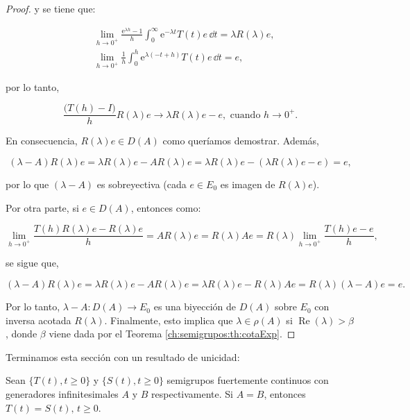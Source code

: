 \begin{proof}
    y se tiene que:

    \begin{align*}
        &\lim_{h \rightarrow 0^+} \frac{\mathrm{e}^{\lambda h} - 1}{h}\int_0^\infty \mathrm{e}^{-\lambda t}T(t)e \, \dd t = \lambda R(\lambda) e,\\
        &\lim_{h \rightarrow 0^+} \frac{1}{h}\int_0^h \mathrm{e}^{\lambda(-t + h)}T(t)e \, \dd t = e,
    \end{align*}

    por lo tanto,

    \[\frac{\big(T(h) - I\big)}{h}R(\lambda)e \rightarrow \lambda R(\lambda) e - e, \text{ cuando } h\rightarrow 0^+. \]

    En consecuencia, $R(\lambda)e \in D(A)$ como queríamos demostrar. Además,

    \[
        (\lambda - A)R(\lambda)e = \lambda R(\lambda)e - AR(\lambda)e = \lambda R(\lambda)e - (\lambda R(\lambda)e - e) = e,
    \]

    por lo que $(\lambda - A)$ es sobreyectiva (cada $e \in E_0$ es imagen de $R(\lambda)e$).

    Por otra parte, si $e \in D(A)$, entonces como:

    \[
        \lim_{h\rightarrow 0^+}\frac{T(h)R(\lambda)e - R(\lambda)e}{h} = AR(\lambda)e = R(\lambda)Ae = R(\lambda)\lim_{h\rightarrow 0^+}\frac{T(h)e - e}{h},
    \]

    se sigue que,

    \[
        (\lambda - A)R(\lambda)e = \lambda R(\lambda)e - A R(\lambda)e = \lambda R(\lambda) e - R(\lambda) A e = R(\lambda)(\lambda - A)e = e.
    \]

    Por lo tanto, $\lambda - A : D(A) \rightarrow E_0$ es una biyección de $D(A)$ sobre $E_0$ con inversa acotada $R(\lambda)$. Finalmente, esto implica que $\lambda \in \rho(A)$ si $\operatorname{Re}(\lambda) > \beta$, donde $\beta$ viene dada por el Teorema \ref{ch:semigrupos:th:cotaExp}.
\end{proof}

Terminamos esta sección con un resultado de unicidad:\\

\begin{Teorema}
    \label{ch:semigrupos:th:unicidadSemigrupos}
    
    Sean $\{T(t), t\geq 0\}$ y $\{S(t), t\geq 0\}$ semigrupos fuertemente continuos con generadores infinitesimales $A$ y $B$ respectivamente. Si $A = B$, entonces $T(t) = S(t), \, t\geq 0$.
\end{Teorema}

